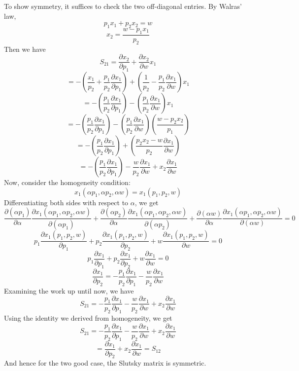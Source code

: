 \documentclass[10pt,letter]{article}
\begin{document}
To show symmetry, it suffices to check the two off-diagonal entries. By Walras' law,
\[ p_1 x_1 + p_2 x_2 = w \]
\[ x_2 = \frac{w - p_1 x_1}{p_2} \]
Then we have
\[ S_{21} = \frac{\partial x_2}{\partial p_1} + \frac{\partial x_2}{\partial w} x_1 \]
\[ = - \left( \frac{x_1}{p_2} + \frac{p_1 }{p_2}\frac{\partial x_1}{\partial p_1} \right) + \left( \frac{1}{p_2} - \frac{p_1}{p_2}\frac{\partial x_1}{ \partial w}\right) x_1 \]
\[ = - \left( \frac{p_1 }{p_2}\frac{\partial x_1}{\partial p_1} \right) - \left( \frac{p_1}{p_2}\frac{\partial x_1}{ \partial w}\right) x_1 \]
\[ = - \left( \frac{p_1 }{p_2}\frac{\partial x_1}{\partial p_1} \right) - \left( \frac{p_1}{p_2}\frac{\partial x_1}{ \partial w}\right) \left( \frac{w - p_2 x_2}{p_1} \right) \]
\[ = - \left( \frac{p_1 }{p_2}\frac{\partial x_1}{\partial p_1} \right) + \left( \frac{p_2 x_2 - w}{p_2}\frac{\partial x_1}{ \partial w}\right)\]
\[ = - \left( \frac{p_1 }{p_2}\frac{\partial x_1}{\partial p_1} \right) - \frac{w}{p_2}\frac{\partial x_1}{ \partial w} + x_2 \frac{\partial x_1}{ \partial w} \]
Now, consider the homogeneity condition:
\[ x_1 (\alpha p_1, \alpha p_2, \alpha w) = x_1(p_1, p_2, w) \]
Differentiating both sides with respect to $\alpha$, we get
\[ \frac{\partial (\alpha p_1)}{\partial \alpha}\frac{\partial x_1 (\alpha p_1, \alpha p_2, \alpha w)}{\partial (\alpha p_1)}+\frac{\partial (\alpha p_2)}{\partial \alpha}\frac{\partial x_1 (\alpha p_1, \alpha p_2, \alpha w)}{\partial (\alpha p_2)}+\frac{\partial (\alpha w)}{\partial \alpha}\frac{\partial x_1 (\alpha p_1, \alpha p_2, \alpha w)}{\partial (\alpha w)} = 0 \]
\[ p_1 \frac{\partial x_1 ( p_1,  p_2,  w)}{\partial p_1}+p_2\frac{\partial x_1 ( p_1,  p_2, w)}{\partial p_2}+ w \frac{\partial x_1 ( p_1,  p_2,  w)}{\partial w} = 0 \]
\[ p_1 \frac{\partial x_1}{\partial p_1}+p_2\frac{\partial x_1}{\partial p_2}+ w \frac{\partial x_1}{\partial w} = 0 \]
\[ \frac{\partial x_1}{\partial p_2} = -\frac{p_1}{p_2} \frac{\partial x_1}{\partial p_1}-\frac{w}{p_2} \frac{\partial x_1}{\partial w}\]
Examining the work up until now, we have
\[ S_{21} =  - \frac{p_1 }{p_2}\frac{\partial x_1}{\partial p_1}  - \frac{w}{p_2}\frac{\partial x_1}{ \partial w} + x_2 \frac{\partial x_1}{ \partial w} \]
Using the identity we derived from homogeneity, we get
\[ S_{21} =  - \frac{p_1 }{p_2}\frac{\partial x_1}{\partial p_1}  - \frac{w}{p_2}\frac{\partial x_1}{ \partial w} + x_2 \frac{\partial x_1}{ \partial w} \]
\[ = \frac{\partial x_1}{\partial p_2} +x_2 \frac{\partial x_1}{ \partial w} = S_{12}  \]
And hence for the two good case, the Slutsky matrix is symmetric.
\end{document}
